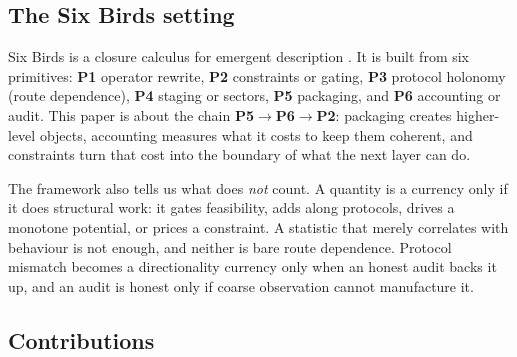 \subsection{The Six Birds setting}

Six Birds is a closure calculus for emergent description \cite{tsiokos2026sixbirds}. It is built from six primitives: \textbf{P1} operator rewrite, \textbf{P2} constraints or gating, \textbf{P3} protocol holonomy (route dependence), \textbf{P4} staging or sectors, \textbf{P5} packaging, and \textbf{P6} accounting or audit. This paper is about the chain \textbf{P5}\(\to\)\textbf{P6}\(\to\)\textbf{P2}: packaging creates higher-level objects, accounting measures what it costs to keep them coherent, and constraints turn that cost into the boundary of what the next layer can do.

The framework also tells us what does \emph{not} count. A quantity is a currency only if it does structural work: it gates feasibility, adds along protocols, drives a monotone potential, or prices a constraint. A statistic that merely correlates with behaviour is not enough, and neither is bare route dependence. Protocol mismatch becomes a directionality currency only when an honest audit backs it up, and an audit is honest only if coarse observation cannot manufacture it.

\subsection{Contributions}

